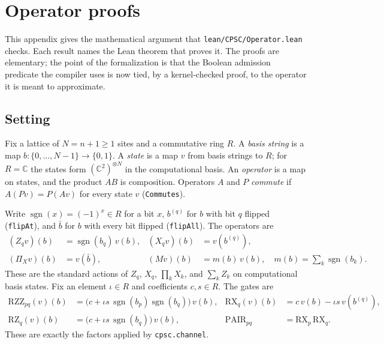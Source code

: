 \documentclass[11pt]{article}
\theoremstyle{definition}
\newcommand{\lean}[1]{\texttt{#1}}
\newcommand{\PiX}{\Pi_X}
\newcommand{\Mag}{M}
\newcommand{\sgn}{\operatorname{sgn}}
\begin{document}
\appendix

\section{Operator proofs}
\label{app:proofs}

This appendix gives the mathematical argument that \lean{lean/CPSC/Operator.lean} checks. Each result names the Lean theorem that proves it. The proofs are elementary; the point of the formalization is that the Boolean admission predicate the compiler uses is now tied, by a kernel-checked proof, to the operator it is meant to approximate.

\subsection{Setting}

Fix a lattice of $N = n + 1 \ge 1$ sites and a commutative ring $R$. A \emph{basis string} is a map $b\colon \{0,\dots,N-1\} \to \{0,1\}$. A \emph{state} is a map $v$ from basis strings to $R$; for $R = \mathbb{C}$ the states form $(\mathbb{C}^2)^{\otimes N}$ in the computational basis. An \emph{operator} is a map on states, and the product $AB$ is composition. Operators $A$ and $P$ \emph{commute} if $A(Pv) = P(Av)$ for every state $v$ (\lean{Commutes}).

Write $\sgn(x) = (-1)^x \in R$ for a bit $x$, $b^{(q)}$ for $b$ with bit $q$ flipped (\lean{flipAt}), and $\bar b$ for $b$ with every bit flipped (\lean{flipAll}). The operators are
\begin{align*}
  (Z_q v)(b) &= \sgn(b_q)\, v(b), &
  (X_q v)(b) &= v(b^{(q)}), \\
  (\PiX v)(b) &= v(\bar b), &
  (\Mag v)(b) &= m(b)\, v(b), \quad m(b) = \textstyle\sum_k \sgn(b_k).
\end{align*}
These are the standard actions of $Z_q$, $X_q$, $\prod_k X_k$, and $\sum_k Z_k$ on computational basis states. Fix an element $\iota \in R$ and coefficients $c, s \in R$. The gates are
\begin{align*}
  \mathrm{RZZ}_{pq}(v)(b) &= \bigl(c + \iota s\, \sgn(b_p)\sgn(b_q)\bigr)\, v(b), &
  \mathrm{RX}_q(v)(b) &= c\, v(b) - \iota s\, v(b^{(q)}), \\
  \mathrm{RZ}_q(v)(b) &= \bigl(c + \iota s\, \sgn(b_q)\bigr)\, v(b), &
  \mathrm{PAIR}_{pq} &= \mathrm{RX}_p\, \mathrm{RX}_q .
\end{align*}
These are exactly the factors applied by \lean{cpsc.channel}.
\end{document}
